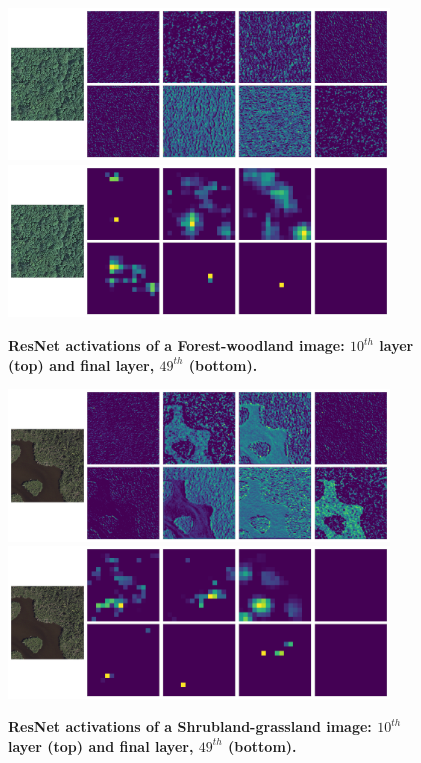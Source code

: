\begin{figure}[h!]
	\centering
	\includegraphics[width=0.9\textwidth]{Figures/activations/forest-woodland_l0_s1_activation_10.png}
	\includegraphics[width=0.9\textwidth]{Figures/activations/forest-woodland_l0_s1_activation_49.png}
	\captionsetup{width=1\linewidth}
	\caption{\textbf{ResNet activations of a Forest-woodland image: $10^{th}$ layer (top) and final layer, $49^{th}$ (bottom).}}
	\label{fig:act_forest_woodland}
\end{figure}

\begin{figure}[h!]
	\centering
	\includegraphics[width=0.9\textwidth]{Figures/activations/shrubland-grassland_l0_s1_activation_10.png}
	\includegraphics[width=0.9\textwidth]{Figures/activations/shrubland-grassland_l0_s1_activation_49.png}
	\captionsetup{width=1\linewidth}
	\caption{\textbf{ResNet activations of a Shrubland-grassland image: $10^{th}$ layer (top) and final layer, $49^{th}$ (bottom).}}
	\label{fig:act_shrubland_grassland}
\end{figure}

